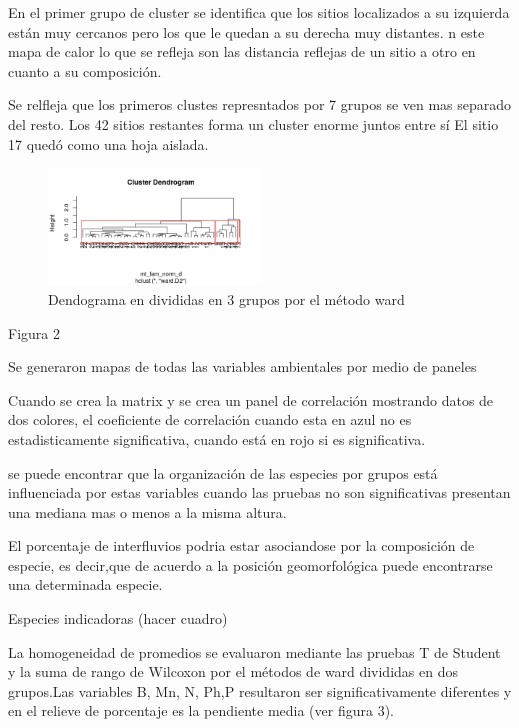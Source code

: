 \documentclass[11pt,]{article}
\begin{document}
En el primer grupo de cluster se identifica que los sitios localizados a
su izquierda están muy cercanos pero los que le quedan a su derecha muy
distantes. n este mapa de calor lo que se refleja son las distancia
reflejas de un sitio a otro en cuanto a su composición.

Se relfleja que los primeros clustes represntados por 7 grupos se ven
mas separado del resto. Los 42 sitios restantes forma un cluster enorme
juntos entre sí El sitio 17 quedó como una hoja aislada.

\begin{figure}
\centering
\includegraphics[width=0.50000\textwidth]{cluster_ward.png}
\caption{Dendograma en divididas en 3 grupos por el método ward}
\end{figure}

Figura 2

Se generaron mapas de todas las variables ambientales por medio de
paneles

Cuando se crea la matrix y se crea un panel de correlación mostrando
datos de dos colores, el coeficiente de correlación cuando esta en azul
no es estadisticamente significativa, cuando está en rojo si es
significativa.

se puede encontrar que la organización de las especies por grupos está
influenciada por estas variables cuando las pruebas no son
significativas presentan una mediana mas o menos a la misma altura.

El porcentaje de interfluvios podria estar asociandose por la
composición de especie, es decir,que de acuerdo a la posición
geomorfológica puede encontrarse una determinada especie.

Especies indicadoras (hacer cuadro)

La homogeneidad de promedios se evaluaron mediante las pruebas T de
Student y la suma de rango de Wilcoxon por el métodos de ward divididas
en dos grupos.Las variables B, Mn, N, Ph,P resultaron ser
significativamente diferentes y en el relieve de porcentaje es la
pendiente media (ver figura 3).
\end{document}
